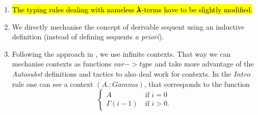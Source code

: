 \begin{enumerate}
\item
  \hl{The typing rules dealing with nameless $\pmb{\lambda}$-terms have to be slightly modified.}
\item
  We directly mechanise the concept of derivable sequent using an inductive definition (instead of defining sequents \textit{a priori}).
\item
  Following the approach in \cite{AutosubstManual}, we use infinite contexts.
  That way we can mechanise contexts as functions \lst$var->type$ and take more advantage of the \textit{Autosubst} definitions and tactics to also deal work for contexts.
  In the \lst$Intro$ rule one can see a context \lst$(A.:Gamma)$, that corresponds to the function
  \[\begin{cases}
    A & \ \text{if $i = 0$} \\
    \Gamma(i-1) & \ \text{if $i > 0$}.
  \end{cases}\]
  
\end{enumerate}


